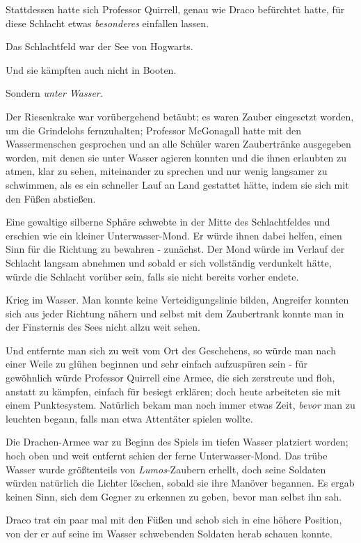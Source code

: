 {Stattdessen hatte sich Professor Quirrell, genau wie Draco befürchtet hatte, für diese Schlacht etwas \emph{besonderes} einfallen lassen.

Das Schlachtfeld war der See von Hogwarts.

Und sie kämpften auch nicht in Booten.

Sondern \emph{unter Wasser.}

Der Riesenkrake war vorübergehend betäubt; es waren Zauber eingesetzt worden, um die Grindelohs fernzuhalten; Professor McGonagall hatte mit den Wassermenschen gesprochen und an alle Schüler waren Zaubertränke ausgegeben worden, mit denen sie unter Wasser agieren konnten und die ihnen erlaubten zu atmen, klar zu sehen, miteinander zu sprechen und nur wenig langsamer zu schwimmen, als es ein schneller Lauf an Land gestattet hätte, indem sie sich mit den Füßen abstießen.

Eine gewaltige silberne Sphäre schwebte in der Mitte des Schlachtfeldes und erschien wie ein kleiner Unterwasser-Mond. Er würde ihnen dabei helfen, einen Sinn für die Richtung zu bewahren - zunächst. Der Mond würde im Verlauf der Schlacht langsam abnehmen und sobald er sich vollständig verdunkelt hätte, würde die Schlacht vorüber sein, falls sie nicht bereits vorher endete.

Krieg im Wasser. Man konnte keine Verteidigungslinie bilden, Angreifer konnten sich aus jeder Richtung nähern und selbst mit dem Zaubertrank konnte man in der Finsternis des Sees nicht allzu weit sehen.

Und entfernte man sich zu weit vom Ort des Geschehens, so würde man nach einer Weile zu glühen beginnen und sehr einfach aufzuspüren sein - für gewöhnlich würde Professor Quirrell eine Armee, die sich zerstreute und floh, anstatt zu kämpfen, einfach für besiegt erklären; doch heute arbeiteten sie mit einem Punktesystem. Natürlich bekam man noch immer etwas Zeit, \emph{bevor} man zu leuchten begann, falls man etwa Attentäter spielen wollte.

Die Drachen-Armee war zu Beginn des Spiels im tiefen Wasser platziert worden; hoch oben und weit entfernt schien der ferne Unterwasser-Mond. Das trübe Wasser wurde größtenteils von \emph{Lumos}-Zaubern erhellt, doch seine Soldaten würden natürlich die Lichter löschen, sobald sie ihre Manöver begannen. Es ergab keinen Sinn, sich dem Gegner zu erkennen zu geben, bevor man selbst ihn sah.

Draco trat ein paar mal mit den Füßen und schob sich in eine höhere Position, von der er auf seine im Wasser schwebenden Soldaten herab schauen konnte.

}
